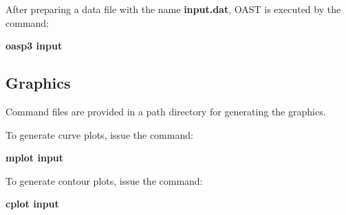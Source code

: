     After preparing a data file with the name {\bf input.dat}, OAST  is 
executed by the command:

    {\bf oasp3 input}


\subsection{Graphics}  

    Command files are provided in a path directory for generating 
the graphics.

\noindent    To generate curve plots, issue the command:

    {\bf mplot input}

\noindent    To generate contour plots, issue the command:

    {\bf cplot input}

